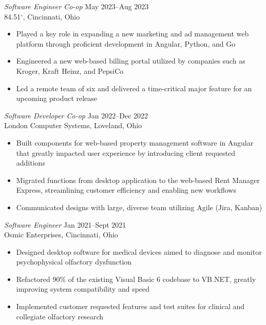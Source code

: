 \documentclass[margin]{res} %
\begin{document}
\begin{resume}
{\sl Software Engineer Co-op\/} \hfill {\color{black} May 2023--Aug 2023}  \\
84.51$^{\circ}$, Cincinnati, Ohio 
\vspace{1mm}
\begin{itemize}  %
\item Played a key role in expanding a new marketing and ad management web platform through proficient development in Angular, Python, and Go
\item Engineered a new web-based billing portal utilized by companies such as Kroger, Kraft Heinz, and PepsiCo
\item Led a remote team of six and delivered a time-critical major feature for an upcoming product release
\end{itemize}


{\sl Software Developer Co-op\/} \hfill {\color{black} Jan 2022--Dec 2022}  \\
London Computer Systems, Loveland, Ohio 
\vspace{1mm}
\begin{itemize}  %
\item Built components for web-based property management software in Angular that greatly impacted user experience by introducing client requested additions
\item Migrated functions from desktop application to the web-based Rent Manager Express, streamlining customer efficiency and enabling new workflows
\item Communicated designs with large, diverse team utilizing Agile (Jira, Kanban)
\end{itemize}


{\sl Software Engineer\/} \hfill {\color{black} Jan 2021--Sept 2021}  \\
Osmic Enterprises, Cincinnati, Ohio
\vspace{1mm}
\begin{itemize} %
\item Designed desktop software for medical devices aimed to diagnose and monitor psychophysical olfactory dysfunction
\item Refactored 90\% of the existing Visual Basic 6 codebase to VB.NET, greatly improving system compatibility and speed   
\item Implemented customer requested features and test suites for clinical and collegiate olfactory research
\end{itemize}


\end{resume}
\end{document}
